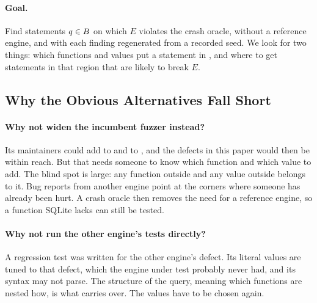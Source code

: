 \paragraph{Goal.} Find statements $q \in B$ on which $E$ violates the crash
oracle, without a reference engine, and with each finding regenerated from a
recorded seed. We look for two things: which functions and values put a
statement in \Blind, and where to get statements in that region that are likely
to break $E$.

\subsection{Why the Obvious Alternatives Fall Short}

\paragraph{Why not widen the incumbent fuzzer instead?} Its maintainers could add
 to \Voc and \imax to \Lit, and the defects in this paper would then be
within reach. But that needs someone to know which function and which value to
add. The blind spot is large: any function outside \Voc and any value outside
\Lit belongs to it. Bug reports from another engine point at the corners where
someone has already been hurt. A crash oracle then removes the need for a
reference engine, so a function SQLite lacks can still be tested.

\paragraph{Why not run the other engine's tests directly?} A regression test was
written for the other engine's defect. Its literal values are tuned to that
defect, which the engine under test probably never had, and its syntax may not
parse. The structure of the query, meaning which functions are nested how, is
what carries over. The values have to be chosen again.
